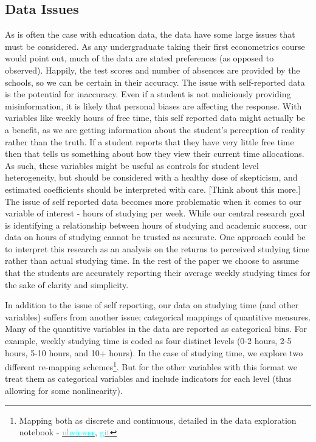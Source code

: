 \documentclass[12pt]{article}
\begin{document}
\subsection{Data Issues} \label{data_issues}
As is often the case with education data, the data have some large issues that must be considered. As any undergraduate taking their first econometrics course would point out, much of the data are stated preferences (as opposed to observed). Happily, the test scores and number of absences are provided by the schools, so we can be certain in their accuracy. The issue with self-reported data is the potential for inaccuracy. Even if a student is not maliciously providing misinformation, it is likely that personal biases are affecting the response. With variables like weekly hours of free time, this self reported data might actually be a benefit, as we are getting information about the student's perception of reality rather than the truth. If a student reports that they have very little free time then that tells us something about how they view their current time allocations. As such, these variables might be useful as controls for student level heterogeneity, but should be considered with a healthy dose of skepticism, and estimated coefficients should be interpreted with care. \textcolor{BrickRed}{[Think about this more.]} The issue of self reported data becomes more problematic when it comes to our variable of interest - hours of studying per week. While our central research goal is identifying a relationship between hours of studying and academic success, our data on hours of studying cannot be trusted as accurate. One approach could be to interpret this research as an analysis on the returns to perceived studying time rather than actual studying time. In the rest of the paper we choose to assume that the students are accurately reporting their average weekly studying times for the sake of clarity and simplicity.

In addition to the issue of self reporting, our data on studying time (and other variables) suffers from another issue; categorical mappings of quantitive measures. Many of the quantitive variables in the data are reported as categorical bins. For example, weekly studying time is coded as four distinct levels (0-2 hours, 2-5 hours, 5-10 hours, and 10+ hours). In the case of studying time, we explore two different re-mapping schemes\footnote{Mapping both as discrete and continuous, detailed in the data exploration notebook - \href{https://nbviewer.jupyter.org/github/nadavtadelis/Reproducible_Metrics/blob/master/data_exploration.ipynb}{\textcolor{cyan}{nbviewer}}, \href{https://github.com/nadavtadelis/Reproducible_Metrics/blob/master/data_exploration.ipynb}{\textcolor{cyan}{git}}}. But for the other variables with this format we treat them as categorical variables and include indicators for each level (thus allowing for some nonlinearity).
\end{document}
